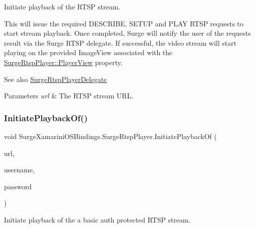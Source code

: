 Initiate playback of the R\+T\+SP stream. 

This will issue the required D\+E\+S\+C\+R\+I\+BE, S\+E\+T\+UP and P\+L\+AY R\+T\+SP requests to start stream playback. Once completed, Surge will notify the user of the requests result via the Surge R\+T\+SP delegate. If successful, the video stream will start playing on the provided Image\+View associated with the \hyperlink{interface_surge_xamarini_o_s_bindings_1_1_surge_rtsp_player_ab629f9303d6b427a8213e1dee03a3810}{Surge\+Rtsp\+Player\+::\+Player\+View} property.

\begin{DoxySeeAlso}{See also}
\hyperlink{interface_surge_xamarini_o_s_bindings_1_1_surge_rtsp_player_delegate}{Surge\+Rtsp\+Player\+Delegate} 
\end{DoxySeeAlso}



\begin{DoxyParams}{Parameters}
{\em url} & The R\+T\+SP stream U\+RL.\\
\hline
\end{DoxyParams}
\mbox{\label{interface_surge_xamarini_o_s_bindings_1_1_surge_rtsp_player_aed2fc640fe87633d54ba35a618b1240d}} 
\subsubsection{\texorpdfstring{Initiate\+Playback\+Of()}{InitiatePlaybackOf()}\hspace{0.1cm}{\footnotesize\ttfamily [2/3]}}
{\footnotesize\ttfamily void Surge\+Xamarini\+O\+S\+Bindings.\+Surge\+Rtsp\+Player.\+Initiate\+Playback\+Of (\begin{DoxyParamCaption}\item[{N\+S\+Url}]{url,  }\item[{N\+S\+String}]{username,  }\item[{N\+S\+String}]{password }\end{DoxyParamCaption})}



Initiate playback of the a basic auth protected R\+T\+SP stream. 

